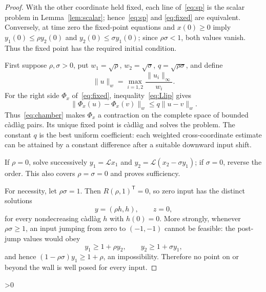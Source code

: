 \documentclass[10pt]{article}
\providecommand{\CRevisionRound}{2}
\newcommand{\norm}[1]{\lVert#1\rVert}
\newcommand{\calL}{\mathcal L}
\begin{document}
\begin{proof}
With the other coordinate held fixed, each line of~\eqref{eq:sp} is the
scalar problem in Lemma~\ref{lem:scalar}; hence~\eqref{eq:sp} and
\eqref{eq:fixed} are equivalent.  Conversely, at time zero the fixed-point
equations and $x(0)\geq0$ imply
$y_1(0)\leq\rho y_2(0)$ and $y_2(0)\leq\sigma y_1(0)$; since
$\rho\sigma<1$, both values vanish.  Thus the fixed point has the required
initial condition.

First suppose $\rho,\sigma>0$, put $w_1=\sqrt\rho$, $w_2=\sqrt\sigma$,
$q=\sqrt{\rho\sigma}$, and define
\[
 \norm{u}_w=\max_{i=1,2}\frac{\norm{u_i}_\infty}{w_i}.
\]
For the right side $\Phi_x$ of~\eqref{eq:fixed}, inequality~\eqref{eq:Llip}
gives
\[
 \norm{\Phi_x(u)-\Phi_x(v)}_w\leq q\norm{u-v}_w.
\]
Thus~\eqref{eq:chamber} makes $\Phi_x$ a contraction on the complete space of
bounded c\`adl\`ag pairs.  Its unique fixed point is c\`adl\`ag and solves the
problem.  The constant $q$ is the best uniform coefficient: each weighted
cross-coordinate estimate can be attained by a constant difference after a
suitable downward input shift.

If $\rho=0$, solve successively
$y_1=\calL x_1$ and $y_2=\calL(x_2-\sigma y_1)$; if $\sigma=0$, reverse the
order.  This also covers $\rho=\sigma=0$ and proves sufficiency.

For necessity, let $\rho\sigma=1$.  Then $R(\rho,1)^\mathsf T=0$, so zero
input has the distinct solutions
\begin{equation}\label{eq:null}
 y=(\rho h,h),\qquad z=0,
\end{equation}
for every nondecreasing c\`adl\`ag $h$ with $h(0)=0$.  More strongly, whenever
$\rho\sigma\geq1$, an input jumping from zero to $(-1,-1)$ cannot be feasible:
the post-jump values would obey
\[
 y_1\geq1+\rho y_2,\qquad y_2\geq1+\sigma y_1,
\]
and hence $(1-\rho\sigma)y_1\geq1+\rho$, an impossibility.  Therefore no
point on or beyond the wall is well posed for every input.
\end{proof}

\ifnum\CRevisionRound>0
\end{document}
